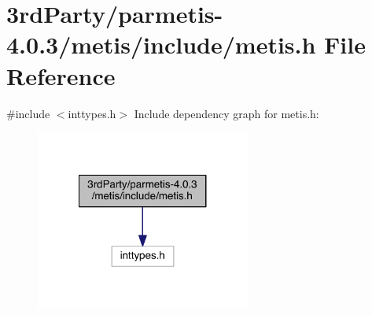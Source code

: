 \hypertarget{3rd_party_2parmetis-4_80_83_2metis_2include_2metis_8h}{}\section{3rd\+Party/parmetis-\/4.0.3/metis/include/metis.h File Reference}
\label{3rd_party_2parmetis-4_80_83_2metis_2include_2metis_8h}
{\ttfamily \#include $<$inttypes.\+h$>$}\newline
Include dependency graph for metis.\+h\+:\nopagebreak
\begin{figure}[H]
\begin{center}
\leavevmode
\includegraphics[width=200pt]{3rd_party_2parmetis-4_80_83_2metis_2include_2metis_8h__incl}
\end{center}
\end{figure}
